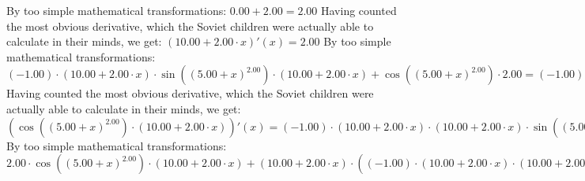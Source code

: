 \documentclass{article}
\begin{document}
By too simple mathematical transformations:
 ${{0.00} + {2.00}} = {2.00}$ 
 \newline
 \newline 
Having counted the most obvious derivative, which the Soviet children were actually able to calculate in their minds, we get:
$({{10.00} + {{2.00} \cdot {x}}})'(x) = {2.00}$\newline
\newline
By too simple mathematical transformations:
 ${{{\left({-1.00}\right) \cdot {\left({{10.00} + {{2.00} \cdot {x}}}\right) \cdot  \sin {\left({\left({{5.00} + {x}}\right) ^ {2.00}}\right)} }} \cdot \left({{10.00} + {{2.00} \cdot {x}}}\right)} + { \cos {\left({\left({{5.00} + {x}}\right) ^ {2.00}}\right)}  \cdot {2.00}}} = {{\left({-1.00}\right) \cdot {\left({{10.00} + {{2.00} \cdot {x}}}\right) \cdot {\left({{10.00} + {{2.00} \cdot {x}}}\right) \cdot  \sin {\left({\left({{5.00} + {x}}\right) ^ {2.00}}\right)} }}} + {{2.00} \cdot  \cos {\left({\left({{5.00} + {x}}\right) ^ {2.00}}\right)} }}$ 
 \newline
 \newline 
Having counted the most obvious derivative, which the Soviet children were actually able to calculate in their minds, we get:
$({ \cos {\left({\left({{5.00} + {x}}\right) ^ {2.00}}\right)}  \cdot \left({{10.00} + {{2.00} \cdot {x}}}\right)})'(x) = {{\left({-1.00}\right) \cdot {\left({{10.00} + {{2.00} \cdot {x}}}\right) \cdot {\left({{10.00} + {{2.00} \cdot {x}}}\right) \cdot  \sin {\left({\left({{5.00} + {x}}\right) ^ {2.00}}\right)} }}} + {{2.00} \cdot  \cos {\left({\left({{5.00} + {x}}\right) ^ {2.00}}\right)} }}$\newline
\newline
By too simple mathematical transformations:
 ${{{2.00} \cdot { \cos {\left({\left({{5.00} + {x}}\right) ^ {2.00}}\right)}  \cdot \left({{10.00} + {{2.00} \cdot {x}}}\right)}} + {\left({{10.00} + {{2.00} \cdot {x}}}\right) \cdot \left({{\left({-1.00}\right) \cdot {\left({{10.00} + {{2.00} \cdot {x}}}\right) \cdot {\left({{10.00} + {{2.00} \cdot {x}}}\right) \cdot  \sin {\left({\left({{5.00} + {x}}\right) ^ {2.00}}\right)} }}} + {{2.00} \cdot  \cos {\left({\left({{5.00} + {x}}\right) ^ {2.00}}\right)} }}\right)}} = {{{2.00} \cdot { \cos {\left({\left({{5.00} + {x}}\right) ^ {2.00}}\right)}  \cdot \left({{10.00} + {{2.00} \cdot {x}}}\right)}} + {\left({{10.00} + {{2.00} \cdot {x}}}\right) \cdot \left({{\left({-1.00}\right) \cdot {\left({{10.00} + {{2.00} \cdot {x}}}\right) \cdot {\left({{10.00} + {{2.00} \cdot {x}}}\right) \cdot  \sin {\left({\left({{5.00} + {x}}\right) ^ {2.00}}\right)} }}} + {{2.00} \cdot  \cos {\left({\left({{5.00} + {x}}\right) ^ {2.00}}\right)} }}\right)}}$ 
\end{document}
